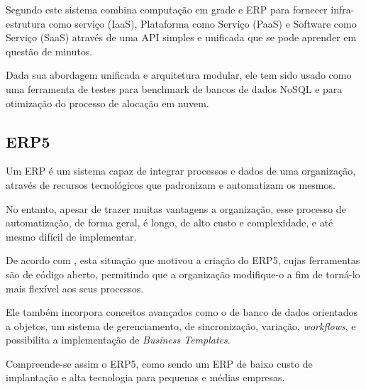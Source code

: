 Segundo \cite{SMETS-CERIN-COURTEAUD} este sistema combina computação em grade e ERP para fornecer infra-estrutura como serviço (IaaS), Plataforma como Serviço (PaaS) e Software como Serviço (SaaS) através de uma API simples e unificada que se pode aprender em questão de minutos.

Dada sua abordagem unificada e arquitetura modular, ele tem sido usado como uma ferramenta de testes para benchmark de bancos de dados NoSQL e para otimização do processo de alocação em nuvem.

\subsection{ERP5}

Um ERP é um sistema capaz de integrar processos e dados de uma organização, através de recursos tecnológicos que padronizam e automatizam os mesmos.

No entanto, apesar de trazer muitas vantagens a organização, esse processo de automatização, de forma geral, é longo, de alto custo e complexidade, e até mesmo difícil de implementar.

De acordo com \cite{SMETS-CARVALHO}, esta situação que motivou a criação do ERP5, cujas ferramentas são de código aberto, permitindo que a organização modifique-o a fim de torná-lo mais flexível aos seus processos.

Ele também incorpora conceitos avançados como o de banco de dados orientados a objetos, um sistema de gerenciamento, de sincronização, variação, \textit{workflows}, e possibilita a implementação de \textit{Business Templates}.

Compreende-se assim o ERP5, como sendo um ERP de baixo custo de implantação e alta tecnologia para pequenas e médias empresas.

